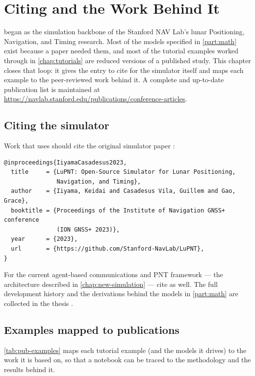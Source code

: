\chapter{Citing \lupnt{} and the Work Behind It}
\label{chap:publications}

\lupnt{} began as the simulation backbone of the Stanford NAV Lab's lunar
Positioning, Navigation, and Timing research. Most of the models specified in \cref{part:math} exist
because a paper needed them, and most of the tutorial examples worked through
in \cref{chap:tutorials} are reduced versions of a published study. This
chapter closes that loop: it gives the entry to cite for the simulator itself
and maps each example to the peer-reviewed work behind it. A complete and
up-to-date publication list is maintained at
\url{https://navlab.stanford.edu/publications/conference-articles}.

\section{Citing the simulator}
\label{sec:pub-cite}

Work that uses \lupnt{} should cite the original simulator paper
\citep{iiyama2023lupnt}:

\begin{lstlisting}[language=bibtexlang, caption={BibTeX entry for the \lupnt{} simulator.}, label={lst:pub-bibtex}]
@inproceedings{IiyamaCasadesus2023,
  title     = {LuPNT: Open-Source Simulator for Lunar Positioning,
               Navigation, and Timing},
  author    = {Iiyama, Keidai and Casadesus Vila, Guillem and Gao, Grace},
  booktitle = {Proceedings of the Institute of Navigation GNSS+ conference
               (ION GNSS+ 2023)},
  year      = {2023},
  url       = {https://github.com/Stanford-NavLab/LuPNT},
}
\end{lstlisting}

For the current agent-based communications and PNT framework --- the
architecture described in \cref{chap:new-simulation} --- cite
\citep{casadesus2025lupnt} as well. The full development history and the
derivations behind the models in \cref{part:math} are collected in the thesis
\citep{iiyama2026thesis}.

\section{Examples mapped to publications}
\label{sec:pub-examples}

\cref{tab:pub-examples} maps each tutorial example (and the models it drives)
to the work it is based on, so that a notebook can be traced to the methodology
and the results behind it.

